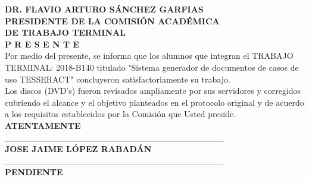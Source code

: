 \documentclass[12pt]{report}
\begin{document}
\begin{flushleft}
	\textbf {DR. FLAVIO ARTURO SÁNCHEZ GARFIAS}\\
	\textbf {PRESIDENTE DE LA COMISIÓN ACADÉMICA}\\
	\textbf {DE TRABAJO TERMINAL}\\
	\textbf {P R E S E N T E}\\
	\vspace*{0.3in}
	Por medio del presente, se informa que los alumnos que integran el TRABAJO TERMINAL: 2018-B140 titulado "Sistema generador de documentos de casos de uso TESSERACT" concluyeron satisfactoriamente su trabajo. \\
	\vspace*{0.3in}
	Los discos (DVD's) fueron revisados ampliamente por sus servidores y corregidos cubriendo el alcance y el objetivo planteados en el protocolo original y de acuerdo a los requisitos establecidos por la Comisión que Usted preside.\\
	\vspace*{0.7in}
	\textbf {ATENTAMENTE}\\
	\vspace*{0.8in}
	\_\_\_\_\_\_\_\_\_\_\_\_\_\_\_\_\_\_\_\_\_\_\_\_\_\_\_\_\_\_\_\_\_\_\_ \\
	\textbf {JOSE JAIME LÓPEZ RABADÁN}\\
		\vspace*{0.8in}
	\_\_\_\_\_\_\_\_\_\_\_\_\_\_\_\_\_\_\_\_\_\_\_\_\_\_\_\_\_\_\_\_\_\_\_ \\
	\textbf {PENDIENTE}\\
\end{flushleft}

\newpage

\vspace*{0.7in}
\end{document}
